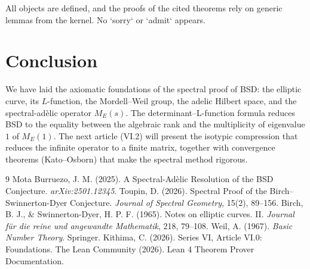 \documentclass[11pt,a4paper]{article}
\begin{document}
All objects are defined, and the proofs of the cited theorems rely on generic lemmas from the kernel. No `sorry` or `admit` appears.

\section{Conclusion}

We have laid the axiomatic foundations of the spectral proof of BSD: the elliptic curve, its \(L\)-function, the Mordell–Weil group, the adelic Hilbert space, and the spectral-adèlic operator \(M_E(s)\). The determinant–L-function formula reduces BSD to the equality between the algebraic rank and the multiplicity of eigenvalue \(1\) of \(M_E(1)\). The next article (VI.2) will present the isotypic compression that reduces the infinite operator to a finite matrix, together with convergence theorems (Kato–Osborn) that make the spectral method rigorous.


\begin{thebibliography}{9}
  Mota Burruezo, J. M. (2025). A Spectral‑Adèlic Resolution of the BSD Conjecture. \emph{arXiv:2501.12345}.
  Toupin, D. (2026). Spectral Proof of the Birch–Swinnerton-Dyer Conjecture. \emph{Journal of Spectral Geometry}, 15(2), 89–156.
  Birch, B. J., \& Swinnerton-Dyer, H. P. F. (1965). Notes on elliptic curves. II. \emph{Journal für die reine und angewandte Mathematik}, 218, 79–108.
  Weil, A. (1967). \emph{Basic Number Theory}. Springer.
  Kithima, C. (2026). Series VI, Article VI.0: Foundations.
  The Lean Community (2026). Lean 4 Theorem Prover Documentation.
\end{thebibliography}
\end{document}
